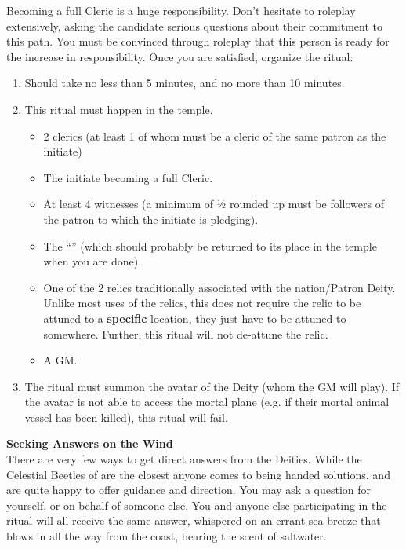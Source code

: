 \documentclass[green]{GL2020}
\begin{document}
Becoming a full Cleric is a huge responsibility. Don’t hesitate to roleplay extensively, asking the candidate serious questions about their commitment to this path. You must be convinced through roleplay that this person is ready for the increase in responsibility. Once you are satisfied, organize the ritual:
  \begin{enumerate}
    \item Should take no less than 5 minutes, and no more than 10 minutes.
    \item This ritual must happen in the temple.
    \begin{itemize}
      \item 2 clerics (at least 1 of whom must be a cleric of the same patron as the initiate)
      \item The initiate becoming a full Cleric.
      \item At least 4 witnesses (a minimum of ½ rounded up must be followers of the patron to which the initiate is pledging).
      \item The ``\iOakStaff{}'' (which should probably be returned to its place in the temple when you are done).
      \item One of the 2 relics traditionally associated with the nation/Patron Deity. Unlike most uses of the relics, this does not require the relic to be attuned to a \textbf{specific} location, they just have to be attuned to somewhere. Further, this ritual will not de-attune the relic.
      \item A GM.
    \end{itemize}
    \item The ritual must summon the avatar of the Deity (whom the GM will play). If the avatar is not able to access the mortal plane (e.g. if their mortal animal vessel has been killed), this ritual will fail. 
  \end{enumerate}
   
\textbf{Seeking Answers on the Wind}\\
There are very few ways to get direct answers from the Deities. While the Celestial Beetles of \cTechGod{} are the closest anyone comes to being handed solutions, \cEbb{} and \cFlow{} are quite happy to offer guidance and direction. You may ask a question for yourself, or on behalf of someone else. You and anyone else participating in the ritual will all receive the same answer, whispered on an errant sea breeze that blows in all the way from the coast, bearing the scent of saltwater.
\end{document}
